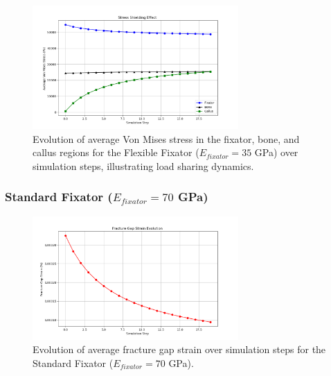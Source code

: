 \documentclass{article}
\begin{document}
\begin{figure}[htbp]
  \centering
  \includegraphics[width=0.7\textwidth]{../output_advanced/Flexible/stress_shielding.png}
  \caption{Evolution of average Von Mises stress in the fixator, bone, and callus regions for the Flexible Fixator ($E_{fixator} = 35$ GPa) over simulation steps, illustrating load sharing dynamics.}
  \label{fig:flexible_stress_shielding}
\end{figure}

\clearpage %

\subsubsection{Standard Fixator (\texorpdfstring{$E_{fixator} = 70$}{E\_fixator = 70} GPa)}

\begin{figure}[htbp]
  \centering
  \includegraphics[width=0.7\textwidth]{../output_advanced/Standard/gap_strain.png}
  \caption{Evolution of average fracture gap strain over simulation steps for the Standard Fixator ($E_{fixator} = 70$ GPa).}
  \label{fig:standard_gap_strain}
\end{figure}
\end{document}
